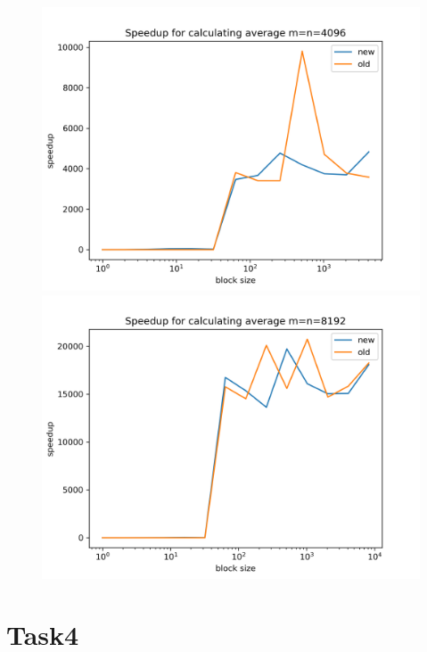 \documentclass[a4paper]{article}
\begin{document}
\begin{figure}[h!]
\begin{minipage}{0.45\linewidth}
		\end{minipage}
		\vspace{0.5cm} %
		\begin{minipage}{0.45\linewidth}
			\centering
			\includegraphics[width=\linewidth]{../float/writeup/reduce_plot_m4096.png}
		\end{minipage}%
		\begin{minipage}{0.45\linewidth}
			\centering
			\includegraphics[width=\linewidth]{../float/writeup/reduce_plot_m8192.png}
		\end{minipage}
	\end{figure}


\section*{Task4}
	
\end{document}
